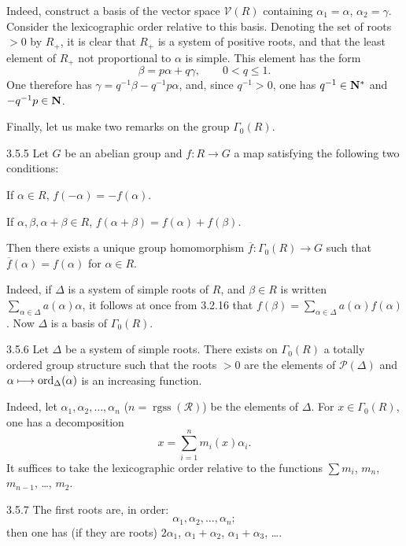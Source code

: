 Indeed, construct a basis of the vector space $\mathcal V(R)$ containing $\alpha_1=\alpha$, $\alpha_2=\gamma$. Consider the lexicographic order relative to this basis. Denoting the set of roots $>0$ by $R_+$, it is clear that $R_+$ is a system of positive roots, and that{\renewcommand{\thefootnote}{(13)}} the least element of $R_+$ not proportional to $\alpha$ is simple. This element has the form
\[
\beta=p\alpha+q\gamma,\qquad0<q\leq1.
\]
One therefore has $\gamma=q^{-1}\beta-q^{-1}p\alpha$, and, since $q^{-1}>0$, one has $q^{-1}\in\mathbf{N}^*$ and $-q^{-1}p\in\mathbf{N}$.

Finally, let us make two remarks on the group $\Gamma_0(R)$.
\begin{proposition}{3.5.5}\label{XXI.3.5.5}
Let $G$ be an abelian group and $f:R\to G$ a map satisfying the following two conditions:
\begin{enumeratei}
\item If $\alpha\in R$, $f(-\alpha)=-f(\alpha)$.
\item If $\alpha,\beta,\alpha+\beta\in R$, $f(\alpha+\beta)=f(\alpha)+f(\beta)$.
\end{enumeratei}
Then there exists a unique group homomorphism $\overline f:\Gamma_0(R)\to G$ such that $\overline f(\alpha)=f(\alpha)$ for $\alpha\in R$.
\end{proposition}
Indeed, if $\Delta$ is a system of simple roots of $R$, and $\beta\in R$ is written $\sum_{\alpha\in\Delta}a(\alpha)\alpha$, it follows at once from 3.2.16 that $f(\beta)=\sum_{\alpha\in\Delta}a(\alpha)f(\alpha)$. Now $\Delta$ is a basis of $\Gamma_0(R)$.
\begin{proposition}{3.5.6}\label{XXI.3.5.6}
Let $\Delta$ be a system of simple roots. There exists on $\Gamma_0(R)$ a totally ordered group structure such that the roots $>0$ are the elements of $\mathcal P(\Delta)$ and $\alpha\longmapsto\operatorname{ord}_\Delta(\alpha)$ is an increasing function.
\end{proposition}
Indeed, let $\alpha_1,\alpha_2,\ldots,\alpha_n$ ($n=\operatorname{rgss}(\mathcal R)$) be the elements of $\Delta$. For $x\in\Gamma_0(R)$, one has a decomposition
\[
x=\sum_{i=1}^nm_i(x)\alpha_i.
\]
It suffices to take the lexicographic order relative to the functions $\sum m_i$, $m_n$, $m_{n-1}$, \ldots, $m_2$.
\begin{remark}{3.5.7}\label{XXI.3.5.7}
The first roots are, in order:
\[
\alpha_1,\alpha_2,\ldots,\alpha_n;
\]
then one has (if they are roots) $2\alpha_1$, $\alpha_1+\alpha_2$, $\alpha_1+\alpha_3$, \ldots.
\end{remark}

